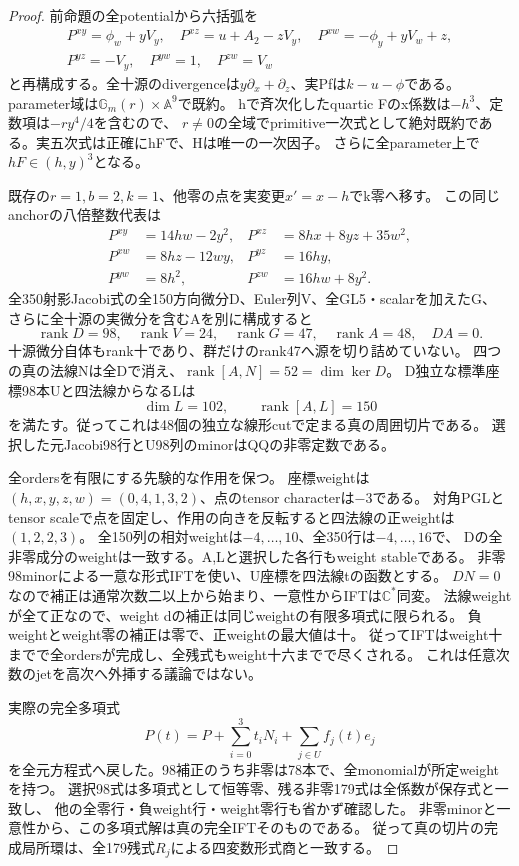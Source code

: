 \documentclass[a4paper,11pt]{ltjsarticle}
\theoremstyle{definition}
\begin{document}
\begin{proof}
前命題の全potentialから六括弧を
\[
 \begin{gathered}
 P^{xy}=\phi_w+yV_y,\quad P^{xz}=u+A_2-zV_y,\quad
 P^{xw}=-\phi_y+yV_w+z,\\
 P^{yz}=-V_y,\quad P^{yw}=1,\quad P^{zw}=V_w
 \end{gathered}
\]
と再構成する。全十源のdivergenceは$y\partial_x+\partial_z$、実Pfは$k-u-\phi$である。
parameter域は$\mathbb G_m(r)\times\mathbb A^9$で既約。
hで斉次化したquartic Fのx係数は$-h^3$、定数項は$-ry^4/4$を含むので、
$r\ne0$の全域でprimitive一次式として絶対既約である。実五次式は正確にhFで、Hは唯一の一次因子。
さらに全parameter上で$hF\in(h,y)^3$となる。

既存の$r=1,b=2,k=1$、他零の点を実変更$x'=x-h$でk零へ移す。
この同じanchorの八倍整数代表は
\[
\begin{aligned}
 P^{xy}&=14hw-2y^2,&P^{xz}&=8hx+8yz+35w^2,\\
 P^{xw}&=8hz-12wy,&P^{yz}&=16hy,\\
 P^{yw}&=8h^2,&P^{zw}&=16hw+8y^2.
\end{aligned}
\]
全350射影Jacobi式の全150方向微分D、Euler列V、全GL5・scalarを加えたG、
さらに全十源の実微分を含むAを別に構成すると
\[
 \operatorname{rank}D=98,\quad\operatorname{rank}V=24,\quad
 \operatorname{rank}G=47,\quad\operatorname{rank}A=48,\quad DA=0.
\]
十源微分自体もrank十であり、群だけのrank47へ源を切り詰めていない。
四つの真の法線Nは全Dで消え、$\operatorname{rank}[A,N]=52=\dim\ker D$。
D独立な標準座標98本Uと四法線からなるLは
\[
 \dim L=102,\qquad\operatorname{rank}[A,L]=150
\]
を満たす。従ってこれは48個の独立な線形cutで定まる真の周囲切片である。
選択した元Jacobi98行とU98列のminorはQQの非零定数である。

全ordersを有限にする先験的な作用を保つ。
座標weightは$(h,x,y,z,w)=(0,4,1,3,2)$、点のtensor characterは$-3$である。
対角PGLとtensor scaleで点を固定し、作用の向きを反転すると四法線の正weightは$(1,2,2,3)$。
全150列の相対weightは$-4,\ldots,10$、全350行は$-4,\ldots,16$で、
Dの全非零成分のweightは一致する。A,Lと選択した各行もweight stableである。
非零98minorによる一意な形式IFTを使い、U座標を四法線tの函数とする。
$DN=0$なので補正は通常次数二以上から始まり、一意性からIFTは$\mathbb C^*$同変。
法線weightが全て正なので、weight dの補正は同じweightの有限多項式に限られる。
負weightとweight零の補正は零で、正weightの最大値は十。
従ってIFTはweight十までで全ordersが完成し、全残式もweight十六までで尽くされる。
これは任意次数のjetを高次へ外挿する議論ではない。

実際の完全多項式
\[
 P(t)=P+\sum_{i=0}^3t_iN_i+\sum_{j\in U}f_j(t)e_j
\]
を全元方程式へ戻した。98補正のうち非零は78本で、全monomialが所定weightを持つ。
選択98式は多項式として恒等零、残る非零179式は全係数が保存式と一致し、
他の全零行・負weight行・weight零行も省かず確認した。
非零minorと一意性から、この多項式解は真の完全IFTそのものである。
従って真の切片の完成局所環は、全179残式$R_j$による四変数形式商と一致する。


\end{proof}
\end{document}
